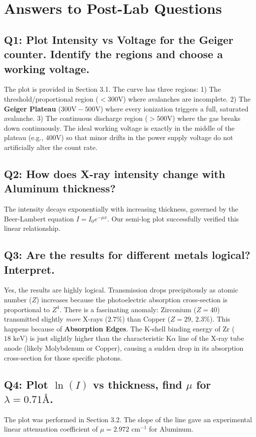 \documentclass[a4paper,11pt]{article}
\begin{document}
\section{Answers to Post-Lab Questions}

\subsection*{Q1: Plot Intensity vs Voltage for the Geiger counter. Identify the regions and choose a working voltage.}
The plot is provided in Section 3.1. The curve has three regions: 1) The threshold/proportional region ($<300\text{V}$) where avalanches are incomplete. 2) The \textbf{Geiger Plateau} ($300\text{V} - 500\text{V}$) where every ionization triggers a full, saturated avalanche. 3) The continuous discharge region ($>500\text{V}$) where the gas breaks down continuously. The ideal working voltage is exactly in the middle of the plateau (e.g., $400\text{V}$) so that minor drifts in the power supply voltage do not artificially alter the count rate.

\subsection*{Q2: How does X-ray intensity change with Aluminum thickness?}
The intensity decays exponentially with increasing thickness, governed by the Beer-Lambert equation $I = I_0 e^{-\mu x}$. Our semi-log plot successfully verified this linear relationship.

\subsection*{Q3: Are the results for different metals logical? Interpret.}
Yes, the results are highly logical. Transmission drops precipitously as atomic number ($Z$) increases because the photoelectric absorption cross-section is proportional to $Z^4$. 
There is a fascinating anomaly: Zirconium ($Z=40$) transmitted slightly \textit{more} X-rays ($2.7\%$) than Copper ($Z=29$, $2.3\%$). This happens because of \textbf{Absorption Edges}. The K-shell binding energy of Zr ($18\text{ keV}$) is just slightly higher than the characteristic K$\alpha$ line of the X-ray tube anode (likely Molybdenum or Copper), causing a sudden drop in its absorption cross-section for those specific photons.

\subsection*{Q4: Plot $\ln(I)$ vs thickness, find $\mu$ for $\lambda=0.71\text{\AA}$.}
The plot was performed in Section 3.2. The slope of the line gave an experimental linear attenuation coefficient of $\mu = 2.972\text{ cm}^{-1}$ for Aluminum.
\end{document}
